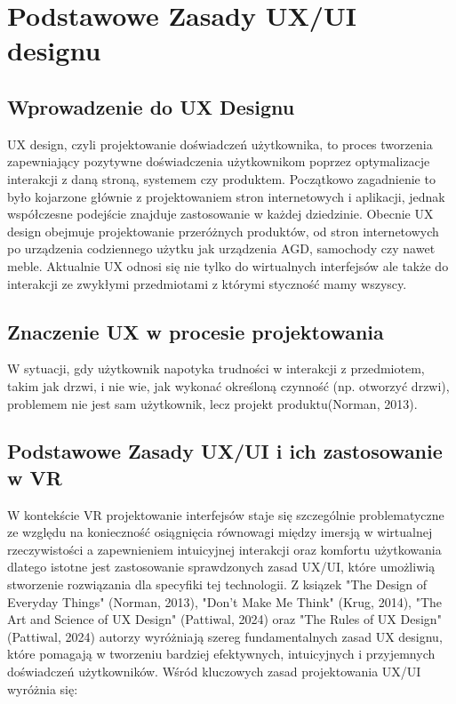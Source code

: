 \chapter{Podstawowe Zasady UX/UI designu}

\section{Wprowadzenie do UX Designu}

 UX design, czyli projektowanie doświadczeń użytkownika, to proces tworzenia zapewniający pozytywne doświadczenia użytkownikom poprzez optymalizacje interakcji z daną stroną, systemem czy produktem. Początkowo zagadnienie to było kojarzone głównie z projektowaniem stron internetowych i aplikacji, jednak współczesne podejście znajduje zastosowanie w każdej dziedzinie. Obecnie UX design obejmuje projektowanie przeróżnych produktów, od stron internetowych po urządzenia codziennego użytku jak urządzenia AGD, samochody czy nawet meble. Aktualnie UX odnosi się nie tylko do wirtualnych interfejsów ale także do interakcji ze zwykłymi przedmiotami z którymi styczność mamy wszyscy.

 \section{Znaczenie UX w procesie projektowania}

 W sytuacji, gdy użytkownik napotyka trudności w interakcji z przedmiotem, takim jak drzwi, i nie wie, jak wykonać określoną czynność (np. otworzyć drzwi), problemem nie jest sam użytkownik, lecz projekt produktu(Norman, 2013).


\section{Podstawowe Zasady UX/UI i ich zastosowanie w VR}

W kontekście VR projektowanie interfejsów staje się szczególnie problematyczne ze względu na konieczność osiągnięcia równowagi między imersją w wirtualnej rzeczywistości a zapewnieniem intuicyjnej interakcji oraz komfortu użytkowania dlatego istotne jest zastosowanie sprawdzonych zasad UX/UI, które umożliwią stworzenie rozwiązania dla specyfiki tej technologii.
Z ksiązek "The Design of Everyday Things" (Norman, 2013), "Don't Make Me Think" (Krug, 2014), "The Art and Science of UX Design" (Pattiwal, 2024) oraz "The Rules of UX Design" (Pattiwal, 2024) autorzy wyróżniają szereg fundamentalnych zasad UX designu, które pomagają w tworzeniu bardziej efektywnych, intuicyjnych i przyjemnych doświadczeń użytkowników.
Wśród kluczowych zasad projektowania UX/UI wyróżnia się:

